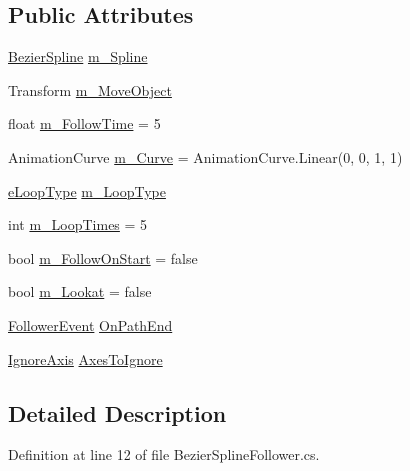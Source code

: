 \subsection*{Public Attributes}
\begin{DoxyCompactItemize}
\item 
\mbox{\hyperlink{class_bezier_spline}{Bezier\+Spline}} \mbox{\hyperlink{class_bezier_spline_follower_ad19dcd82c226227a5a1009a8939d3603}{m\+\_\+\+Spline}}
\item 
Transform \mbox{\hyperlink{class_bezier_spline_follower_a271d6de7eb8b8502157a3b14939be03e}{m\+\_\+\+Move\+Object}}
\item 
float \mbox{\hyperlink{class_bezier_spline_follower_a73321223457f715c52ce6f134fa17696}{m\+\_\+\+Follow\+Time}} = 5
\item 
Animation\+Curve \mbox{\hyperlink{class_bezier_spline_follower_a924000fca223028d37b074e9e12a2adb}{m\+\_\+\+Curve}} = Animation\+Curve.\+Linear(0, 0, 1, 1)
\item 
\mbox{\hyperlink{class_bezier_spline_follower_a418bf6c27ad6a16dbd39b309bee6a602}{e\+Loop\+Type}} \mbox{\hyperlink{class_bezier_spline_follower_a8a8c112838dde8ae3911db4104e59278}{m\+\_\+\+Loop\+Type}}
\item 
int \mbox{\hyperlink{class_bezier_spline_follower_a83a5314b505ad1a49dd429ab6e57c415}{m\+\_\+\+Loop\+Times}} = 5
\item 
bool \mbox{\hyperlink{class_bezier_spline_follower_a692ca3e755fcb4e472bd725016e31183}{m\+\_\+\+Follow\+On\+Start}} = false
\item 
bool \mbox{\hyperlink{class_bezier_spline_follower_a2f778f4fac97ed680a42203ac395e964}{m\+\_\+\+Lookat}} = false
\item 
\mbox{\hyperlink{class_bezier_spline_follower_1_1_follower_event}{Follower\+Event}} \mbox{\hyperlink{class_bezier_spline_follower_af95926bc84f097c69a5aeaff540e0197}{On\+Path\+End}}
\item 
\mbox{\hyperlink{_ignore_axis_8cs_aa61b0141055d583a4f5b013297a1d48f}{Ignore\+Axis}} \mbox{\hyperlink{class_bezier_spline_follower_a93464a77def4cdfa03248a7be07c3eff}{Axes\+To\+Ignore}}
\end{DoxyCompactItemize}


\subsection{Detailed Description}


Definition at line 12 of file Bezier\+Spline\+Follower.\+cs.



